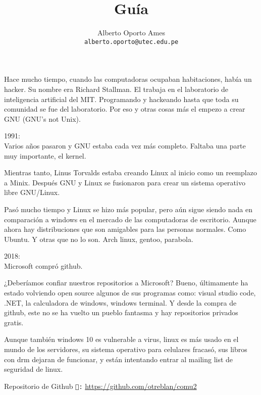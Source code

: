 \documentclass[12pt]{article}
\title{\textbf{Guía}}
\author{
		Alberto Oporto Ames\\
		\texttt{alberto.oporto@utec.edu.pe}
		}
\begin{document}
\maketitle
\thispagestyle{fancy}

Hace mucho tiempo, cuando las computadoras ocupaban habitaciones, había un hacker.
Su nombre era Richard Stallman.
El trabaja en el laboratorio de inteligencia artificial del MIT.
Programando y hackeando hasta que toda su comunidad se fue del laboratorio.
Por eso y otras cosas más el empezo a crear GNU (GNU's not Unix).

1991:\\
Varios años pasaron y GNU estaba cada vez más completo.
Faltaba una parte muy importante, el kernel.

Mientras tanto, Linus Torvalds estaba creando Linux al inicio como un reemplazo a Minix.
Después GNU y Linux se fusionaron para crear un sistema operativo libre GNU/Linux.

Pasó mucho tiempo y Linux se hizo más popular,
pero aún sigue siendo nada en comparación a windows en el mercado de las computadoras de escritorio.
Aunque ahora hay distribuciones que son amigables para las personas normales.
Como Ubuntu.
Y otras que no lo son.
Arch linux, gentoo, parabola.

2018:\\
Microsoft compró github.

¿Deberíamos confiar nuestros repositorios a Microsoft?
Bueno, últimamente ha estado volviendo open source algunos de sus programas como: visual studio code, .NET, la calculadora de windows, windows terminal.
Y desde la compra de github, este no se ha vuelto un pueblo fantasma y hay repositorios privados gratis.

Aunque también windows 10 es vulnerable a virus,
linux es más usado en el mundo de los servidores,
su sistema operativo para celulares fracasó,
sus libros con drm dejaran de funcionar,
y están intentando entrar al mailing list de seguridad de linux.

\vfill
Repositorio de Github \texttt{:} \url{https://github.com/otreblan/comu2}
\end{document}
